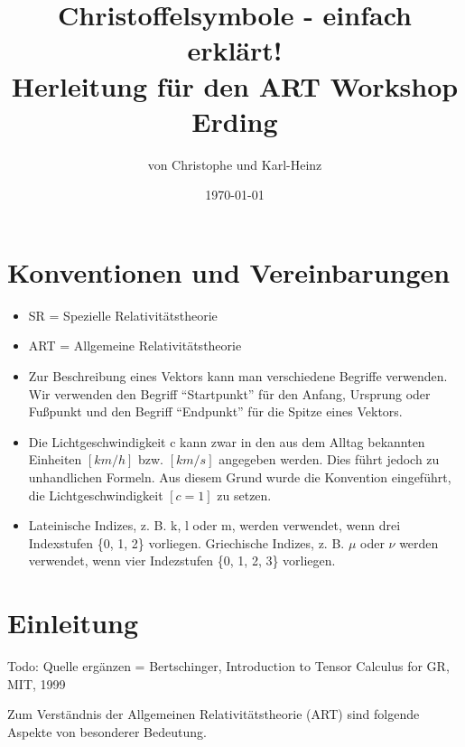 \documentclass[11pt,a4paper]{article}
\title{Christoffelsymbole - einfach erklärt! \\
      Herleitung für den ART Workshop Erding}
\author{von Christophe und Karl-Heinz}
\date{\today}
\begin{document}
\maketitle

\section{Konventionen und Vereinbarungen}

\begin{itemize}

\item SR = Spezielle Relativitätstheorie

\item ART = Allgemeine Relativitätstheorie

\item 
Zur Beschreibung eines Vektors kann man verschiedene Begriffe verwenden. Wir verwenden den Begriff "`Startpunkt"' für den Anfang, Ursprung oder Fußpunkt und den Begriff "`Endpunkt"' für die Spitze eines Vektors. 

\item 
Die Lichtgeschwindigkeit c kann zwar in den aus dem Alltag bekannten Einheiten $ [km/h] $ bzw. $ [km/s] $  angegeben werden. Dies führt jedoch zu unhandlichen Formeln. Aus diesem Grund wurde die Konvention eingeführt, die Lichtgeschwindigkeit $ [c = 1] $ zu setzen. 

\item
Lateinische Indizes, z. B. k, l oder m, werden verwendet, wenn drei Indexstufen \{0, 1, 2\} vorliegen.
Griechische Indizes, z. B. $ \mu $ oder $ \nu $ werden verwendet, wenn vier Indezstufen \{0, 1, 2, 3\} vorliegen.


\end{itemize}

\section{Einleitung}

Todo: Quelle ergänzen = Bertschinger, Introduction to Tensor Calculus for GR, MIT, 1999

Zum Verständnis der Allgemeinen Relativitätstheorie (ART) sind folgende Aspekte von besonderer Bedeutung. 
\end{document}
